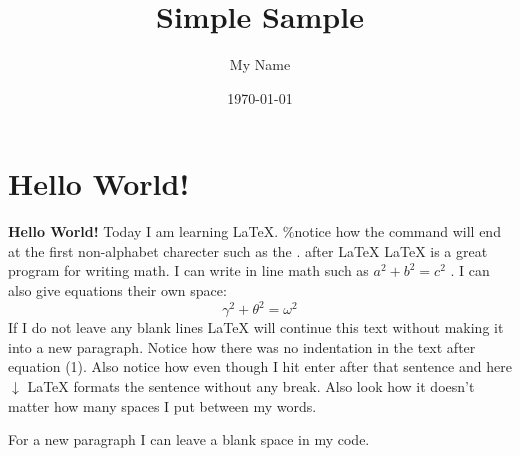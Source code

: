 \documentclass{article} %
\title{Simple Sample} %
\author{My Name} %
\date{\today} %
\begin{document}
\maketitle %


\section{Hello World!} %

\textbf{Hello World!} Today I am learning \LaTeX. \%notice how the command will end at the first non-alphabet charecter such as the . after \LaTeX
\LaTeX{} is a great program for writing math.
I can write in line math such as $a^2+b^2=c^2$ %
. I can also give equations their own space:
\begin{equation} %
	\gamma^2+\theta^2=\omega^2
\end{equation}
If I do not leave any blank lines \LaTeX{} will continue  this text without making it into a new paragraph.
Notice how there was no indentation in the text after equation (1).
Also notice how even though I hit enter after that sentence and here $\downarrow$
\LaTeX{} formats the sentence without any break.
Also   look  how      it   doesn't     matter          how    many  spaces     I put     between       my    words.

For a new paragraph I can leave a blank space in my code.
\end{document}
